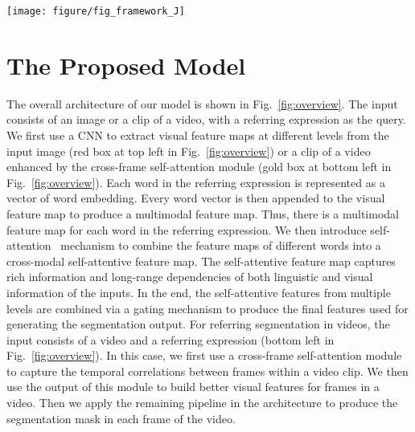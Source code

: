 \begin{figure*}[ht]
\begin{center}
\texttt{[image: figure/fig\_framework\_J]}
\end{center}
   \caption{An overview of our approach. The proposed model consists of three components including multimodal feature generation, cross-modal self-attention (CMSA) and a gated multi-level fusion. Multimodal feature generation are constructed from the visual feature, the spatial coordinate feature and the language feature for each word. For referring segmentation in video, a clip of adjacent frames is used to extract temporal correlation feature by cross-frame self-attention (CFSA) for producing visual feature of the current frame as shown in the gold box. Then the multimodal feature at each level is fed to a cross-modal self-attention module to build long-range dependencies across individual words and spatial regions. Finally, the gated multi-level fusion module combines the features from different levels to produce the final segmentation mask. The red arrows and gold arrows show the input and output for the image and video, respectively.}
\label{fig:overview}
\end{figure*}

\section{The Proposed Model}\label{sec:approach}

The overall architecture of our model is shown in Fig.~\ref{fig:overview}. The input consists of an image or a clip of a video, with a referring expression as the query. We first use a CNN to extract visual feature maps at different levels from the input image (red box at top left in Fig.~\ref{fig:overview}) or a clip of a video enhanced by the cross-frame self-attention module (gold box at bottom left in Fig.~\ref{fig:overview}). Each word in the referring expression is represented as a vector of word embedding. Every word vector is then appended to the visual feature map to produce a multimodal feature map. Thus, there is a multimodal feature map for each word in the referring expression. We then introduce self-attention~\cite{vaswani2017attention} mechanism to combine the feature maps of different words into a cross-modal self-attentive feature map. The self-attentive feature map captures rich information and long-range dependencies of both linguistic and visual information of the inputs. In the end, the self-attentive features from multiple levels are combined via a gating mechanism to produce the final features used for generating the segmentation output. For referring segmentation in videos, the input consists of a video and a referring expression (bottom left in Fig.~\ref{fig:overview}). In this case, we first use a cross-frame self-attention module to capture the temporal correlations between frames within a video clip. We then use the output of this module to build better visual features for frames in a video. Then we apply the remaining pipeline in the architecture to produce the segmentation mask in each frame of the video.


